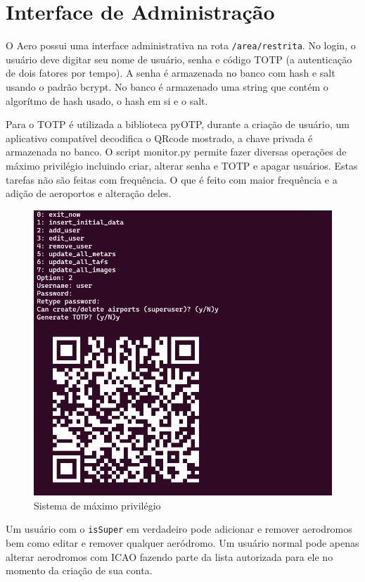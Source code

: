 \chapter{Interface de Administração}

O Aero possui uma interface administrativa na rota \verb|/area/restrita|. No login,
o usuário deve digitar seu nome de usuário, senha e código TOTP (a autenticação
de dois fatores por tempo). A senha é armazenada no banco com hash e salt usando 
o padrão bcrypt. No banco é armazenado uma string que contém o algorítmo de hash
usado, o hash em si e o salt. 

Para o TOTP é utilizada a biblioteca pyOTP, durante a criação de usuário, um 
aplicativo compatível decodifica o QRcode mostrado, a chave privada é armazenada 
no banco. O script monitor.py permite fazer diversas operações de máximo privilégio 
incluindo criar, alterar senha e TOTP e apagar usuários. Estas tarefas não são 
feitas com frequência. O que é feito com maior frequência e a adição de aeroportos 
e alteração deles.

\begin{figure}[ht]
    \begin{center}
    \includegraphics[width=0.8\linewidth]{img/create-user-script.png}
    \caption{Sistema de máximo privilégio}
    \label{fig:max-priv-sys}
    \end{center}
\end{figure}

Um usuário com o \verb|isSuper| em verdadeiro pode adicionar e remover aerodromos 
bem como editar e remover qualquer aeródromo. Um usuário normal pode apenas alterar 
aerodromos com ICAO fazendo parte da lista autorizada para ele no momento da criação
de sua conta.

